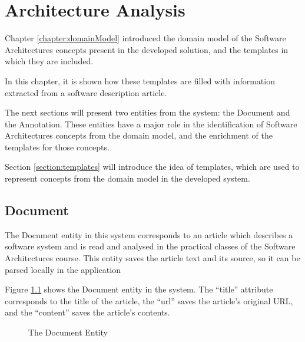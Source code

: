 
\chapter{Architecture Analysis}
\label{chapter:architecture}
Chapter \ref{chapter:domainModel} introduced the domain model of the Software Architectures concepts present in the developed solution, and the templates in which they are included.

In this chapter, it is shown how these templates are filled with information extracted from a software description article.

The next sections will present two entities from the system: the Document and the Annotation. These entities have a major role in the identification of Software Architectures concepts from the domain model, and the enrichment of the templates for those concepts.

Section \ref{section:templates} will introduce the idea of templates, which are used to represent concepts from the domain model in the developed system. 

\section{Document}
\label{section:document}

The Document entity in this system corresponds to an article which describes a software system and is read and analysed in the practical classes of the Software Architectures course. This entity saves the article text and its source, so it can be parsed locally in the application

Figure \ref{figure:documentEntity} shows the Document entity in the system. The ``title'' attribute corresponds to the title of the article, the ``url'' saves the article's original URL, and the ``content'' saves the article's contents.

\begin{figure}[h]
\centering
\renewcommand {\umltextcolor}{black}
\renewcommand {\umlfillcolor}{none}
\renewcommand {\umldrawcolor}{black}

\caption{The Document Entity}
\label{figure:documentEntity}
\end{figure}

